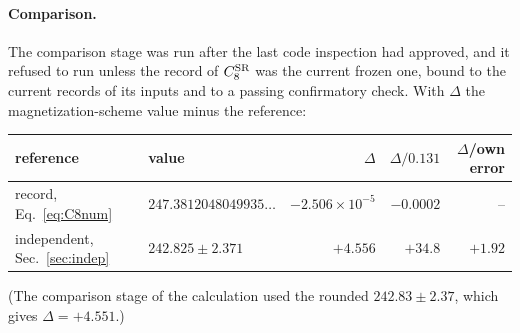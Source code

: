 \documentclass[11pt,a4paper]{article}
\numberwithin{equation}{section}
\newcommand{\CSR}{C^{\rm SR}}
\newcommand{\sci}[2]{#1\times10^{#2}}
\begin{document}
\paragraph{Comparison.} The comparison stage was run after the last code inspection had approved, and it refused to
run unless the record of $\CSR_8$ was the current frozen one, bound to the current records of its inputs and to a
passing confirmatory check. With $\Delta$ the magnetization-scheme value minus the reference:
\begin{center}\small
\begin{tabular}{@{}llrrr@{}}
\toprule
reference & value & $\Delta$ & $\Delta/0.131$ & $\Delta$/own error\\
\midrule
record, Eq.~\eqref{eq:C8num} & $247.3812048049935\ldots$ & $\sci{-2.506}{-5}$ & $-0.0002$ & --\\
independent, Sec.~\ref{sec:indep} & $242.825\pm2.371$ & $+4.556$ & $+34.8$ & $+1.92$\\
\bottomrule
\end{tabular}
\end{center}
(The comparison stage of the calculation used the rounded $242.83\pm2.37$, which gives $\Delta=+4.551$.)
\end{document}
